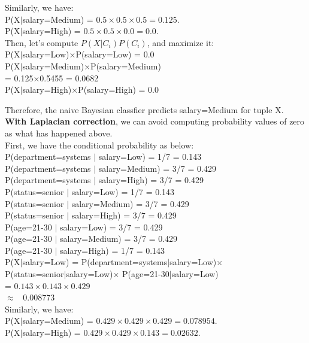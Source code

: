 \documentclass{article}
\begin{document}
\begin{enumerate}
\begin{enumerate}
Similarly, we have: \\
P(X$|$salary=Medium) = $0.5 \times 0.5 \times 0.5 = 0.125$. \\
P(X$|$salary=High) = $0.5 \times 0.5 \times 0.0 = 0.0$. \\

Then, let's compute $P(X|C_i)P(C_i)$, and maximize it: \\
P(X$|$salary=Low)$\times$P(salary=Low) = 0.0 \\
P(X$|$salary=Medium)$\times$P(salary=Medium) \\
= 0.125$\times$0.5455 = 0.0682 \\
P(X$|$salary=High)$\times$P(salary=High) = 0.0

Therefore, the naive Bayesian classfier predicts salary=Medium for
tuple X. \\

\textbf{With Laplacian correction}, we can avoid computing probability
values of zero as what has happened above. \\
First, we have the conditional probability as below: \\
P(department=systems $|$ salary=Low) = 1/7 = 0.143 \\
P(department=systems $|$ salary=Medium) = 3/7 = 0.429 \\
P(department=systems $|$ salary=High) = 3/7 = 0.429 \\
P(status=senior $|$ salary=Low) = 1/7 = 0.143 \\
P(status=senior $|$ salary=Medium) = 3/7 = 0.429 \\
P(status=senior $|$ salary=High) = 3/7 = 0.429 \\
P(age=21-30 $|$ salary=Low) = 3/7 = 0.429 \\
P(age=21-30 $|$ salary=Medium) = 3/7 = 0.429 \\
P(age=21-30 $|$ salary=High) = 1/7 = 0.143\\

P(X$|$salary=Low) = P(department=systems$|$salary=Low)$\times$ \\
P(status=senior$|$salary=Low)$\times$ P(age=21-30$|$salary=Low) \\
= $0.143 \times 0.143 \times 0.429$ \\
$\approx$~ 0.008773\\

Similarly, we have: \\
P(X$|$salary=Medium) = $0.429 \times 0.429 \times 0.429 = 0.078954$. \\
P(X$|$salary=High) = $0.429 \times 0.429 \times 0.143 = 0.02632$. \\


\end{enumerate}
\end{enumerate}
\end{document}
